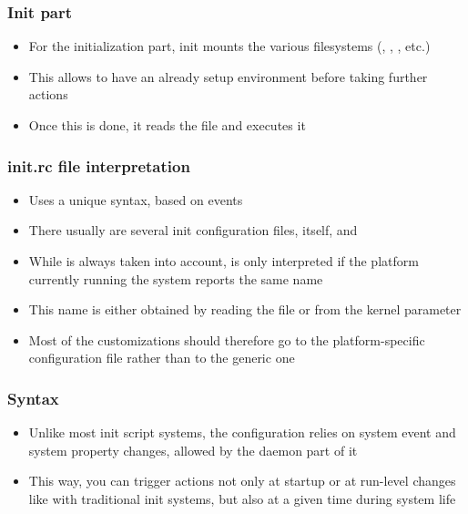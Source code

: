 \begin{frame}
  \frametitle{Init part}
  \begin{itemize}
  \item For the initialization part, init mounts the various
    filesystems (, , , etc.)
  \item This allows to have an already setup environment before taking
    further actions
  \item Once this is done, it reads the  file and
    executes it
  \end{itemize}
\end{frame}

\begin{frame}
  \frametitle{init.rc file interpretation}
  \begin{itemize}
  \item Uses a unique syntax, based on events
  \item There usually are several init configuration files,
     itself, and 
  \item While  is always taken into account,
     is only interpreted if the platform
    currently running the system reports the same name
  \item This name is either obtained by reading the file
     or from the 
    kernel parameter
  \item Most of the customizations should therefore go to the
    platform-specific configuration file rather than to the generic
    one
  \end{itemize}
\end{frame}

\begin{frame}
  \frametitle{Syntax}
  \begin{itemize}
  \item Unlike most init script systems, the configuration relies on
    system event and system property changes, allowed by the
    daemon part of it
  \item This way, you can trigger actions not only at startup or at
    run-level changes like with traditional init systems, but also at
    a given time during system life
  \end{itemize}
\end{frame}

